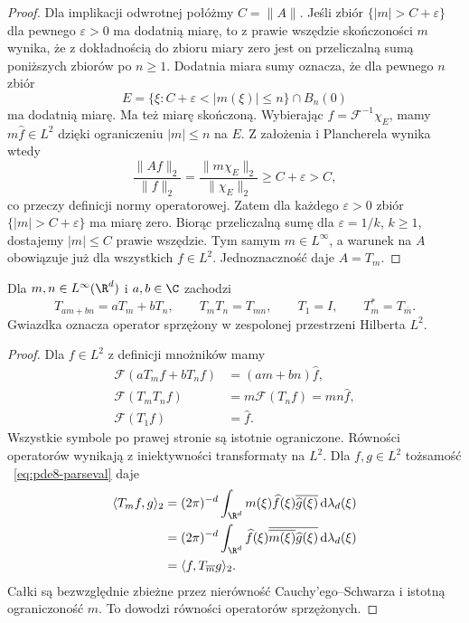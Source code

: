 \begin{proof}
Dla implikacji odwrotnej połóżmy $C=\|A\|$.
Jeśli zbiór $\{|m|>C+\varepsilon\}$ dla pewnego
$\varepsilon>0$ ma dodatnią miarę, to z
prawie wszędzie skończoności $m$ wynika, że
z dokładnością do zbioru miary zero jest on
przeliczalną sumą poniższych zbiorów po $n\ge1$.
Dodatnia miara sumy oznacza, że dla pewnego $n$ zbiór
\[
 E=\{\xi:C+\varepsilon<|m(\xi)|\le n\}
       \cap B_n(0)
\]
ma dodatnią miarę. Ma też miarę skończoną.
Wybierając $f=\mathcal F^{-1}\chi_E$,
mamy $m\widehat f\in L^2$ dzięki ograniczeniu
$|m|\le n$ na $E$. Z założenia i Plancherela
wynika wtedy
\[
 \frac{\|Af\|_2}{\|f\|_2}
 =\frac{\|m\chi_E\|_2}{\|\chi_E\|_2}
 \ge C+\varepsilon>C,
\]
co przeczy definicji normy operatorowej.
Zatem dla każdego $\varepsilon>0$ zbiór
$\{|m|>C+\varepsilon\}$ ma miarę zero.
Biorąc przeliczalną sumę dla
$\varepsilon=1/k$, $k\ge1$, dostajemy
$|m|\le C$ prawie wszędzie. Tym samym
$m\in L^\infty$, a warunek na $A$ obowiązuje
już dla wszystkich $f\in L^2$.
Jednoznaczność daje $A=T_m$.
\end{proof}

\begin{wniosek}
Dla $m,n\in L^\infty(\R^d)$ i $a,b\in\C$ zachodzi
\[
 T_{am+bn}=aT_m+bT_n,\qquad
 T_mT_n=T_{mn},\qquad T_1=I,\qquad
 T_m^*=T_{\overline m}.
\]
Gwiazdka oznacza operator sprzężony w zespolonej
przestrzeni Hilberta $L^2$.
\end{wniosek}
\begin{proof}
Dla $f\in L^2$ z definicji mnożników mamy
\[
 \begin{aligned}
 \mathcal F(aT_mf+bT_nf)&=(am+bn)\widehat f,\\
 \mathcal F(T_mT_nf)&=m\mathcal F(T_nf)=mn\widehat f,\\
 \mathcal F(T_1f)&=\widehat f.
 \end{aligned}
\]
Wszystkie symbole po prawej stronie są istotnie
ograniczone. Równości operatorów wynikają
z iniektywności transformaty na $L^2$.
Dla $f,g\in L^2$ tożsamość
~\eqref{eq:pde8-parseval} daje
\[
 \begin{aligned}
 \langle T_m f,g\rangle_2
 &=(2\pi)^{-d}\int_{\R^d}m(\xi)\widehat f(\xi)
       \overline{\widehat g(\xi)}\,\mathrm d\lambda_d(\xi)\\
 &=(2\pi)^{-d}\int_{\R^d}\widehat f(\xi)
       \overline{\overline{m(\xi)}\widehat g(\xi)}
       \,\mathrm d\lambda_d(\xi)\\
 &=\langle f,T_{\overline m}g\rangle_2.
 \end{aligned}
\]
Całki są bezwzględnie zbieżne przez nierówność
Cauchy'ego--Schwarza i istotną ograniczoność $m$.
To dowodzi równości operatorów sprzężonych.
\end{proof}

